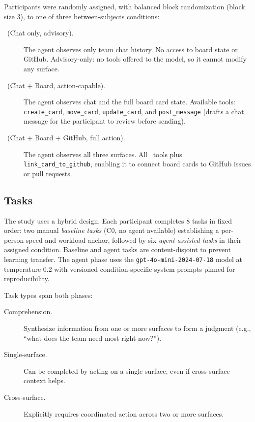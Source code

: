 Participants were randomly assigned, with balanced block randomization (block
size 3), to one of three between-subjects conditions:

\begin{description}
  \item[\CI~(Chat only, advisory).] The agent observes only team chat history.
    No access to board state or GitHub. Advisory-only: no tools offered to the
    model, so it cannot modify any surface.

  \item[\CII~(Chat + Board, action-capable).] The agent observes chat and the
    full board card state. Available tools: \texttt{create\_card},
    \texttt{move\_card}, \texttt{update\_card}, and \texttt{post\_message}
    (drafts a chat message for the participant to review before sending).

  \item[\CIII~(Chat + Board + GitHub, full action).] The agent observes all
    three surfaces. All \CII\ tools plus \texttt{link\_card\_to\_github},
    enabling it to connect board cards to GitHub issues or pull requests.
\end{description}

\subsection{Tasks}
\label{sec:study:tasks}

The study uses a hybrid design. Each participant completes 8 tasks in fixed
order: two manual \emph{baseline tasks} (C0, no agent available) establishing a
per-person speed and workload anchor, followed by six \emph{agent-assisted
tasks} in their assigned condition. Baseline and agent tasks are
content-disjoint to prevent learning transfer. The agent phase uses the
\texttt{gpt-4o-mini-2024-07-18} model at temperature 0.2 with versioned
condition-specific system prompts pinned for reproducibility.

Task types span both phases:

\begin{description}
  \item[Comprehension.] Synthesize information from one or more surfaces to
    form a judgment (e.g., ``what does the team need most right now?'').
  \item[Single-surface.] Can be completed by acting on a single surface, even
    if cross-surface context helps.
  \item[Cross-surface.] Explicitly requires coordinated action across two or
    more surfaces.
\end{description}

